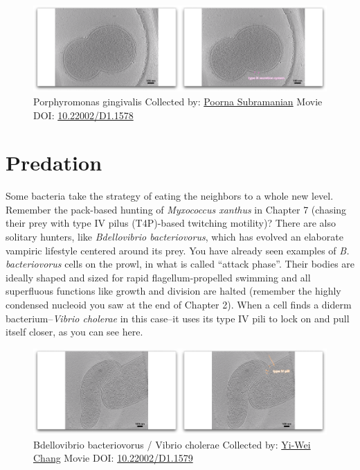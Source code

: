 \documentclass[]{tufte-book}
\begin{document}
\begin{figure}
\includegraphics{movie_stills/9_8} \caption[Porphyromonas gingivalis Collected by:
\protect\hyperlink{poorna_subramanian}{Poorna Subramanian} Movie DOI:
\href{https://doi.org/10.22002/D1.1578}{10.22002/D1.1578}]{Porphyromonas gingivalis Collected by:
\protect\hyperlink{poorna_subramanian}{Poorna Subramanian} Movie DOI:
\href{https://doi.org/10.22002/D1.1578}{10.22002/D1.1578}}\label{fig:9-8}
\end{figure}

\section{Predation}\label{predation}

Some bacteria take the strategy of eating the neighbors to a whole new
level. Remember the pack-based hunting of \emph{Myxococcus xanthus} in
Chapter 7 (chasing their prey with type IV pilus (T4P)-based twitching
motility)? There are also solitary hunters, like \emph{Bdellovibrio
bacteriovorus}, which has evolved an elaborate vampiric lifestyle
centered around its prey. You have already seen examples of \emph{B.
bacteriovorus} cells on the prowl, in what is called ``attack phase''.
Their bodies are ideally shaped and sized for rapid flagellum-propelled
swimming and all superfluous functions like growth and division are
halted (remember the highly condensed nucleoid you saw at the end of
Chapter 2). When a cell finds a diderm bacterium--\emph{Vibrio cholerae}
in this case--it uses its type IV pili to lock on and pull itself
closer, as you can see here.





\begin{figure}
\includegraphics{movie_stills/9_9} \caption[Bdellovibrio bacteriovorus / Vibrio cholerae Collected by:
\protect\hyperlink{yi-wei_chang}{Yi-Wei Chang} Movie DOI:
\href{https://doi.org/10.22002/D1.1579}{10.22002/D1.1579}]{Bdellovibrio bacteriovorus / Vibrio cholerae Collected by:
\protect\hyperlink{yi-wei_chang}{Yi-Wei Chang} Movie DOI:
\href{https://doi.org/10.22002/D1.1579}{10.22002/D1.1579}}\label{fig:9-9}
\end{figure}
\end{document}
